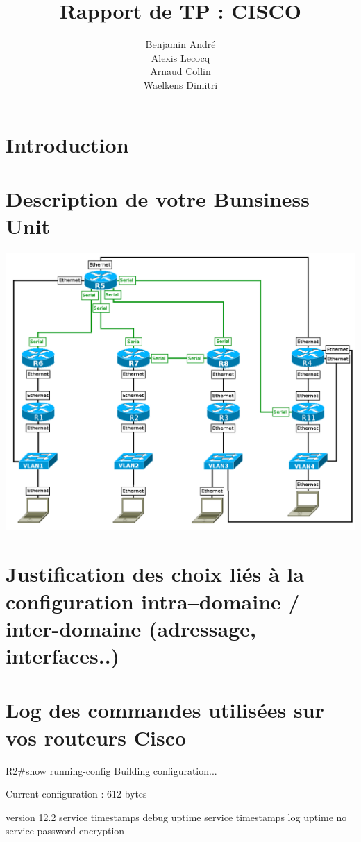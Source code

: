 \documentclass{article}
\author{Benjamin André\\Alexis Lecocq\\Arnaud Collin\\Waelkens Dimitri}
\title{Rapport de TP : CISCO}
\begin{document}
\maketitle

\section{Introduction}%

\section{Description de votre Bunsiness Unit}

\includegraphics[scale=0.2]{image.png}

\section{Justification des choix liés à la configuration intra--domaine / inter-domaine (adressage, interfaces..)}

\section{Log des commandes utilisées sur vos routeurs Cisco}

R2\#show running-config
Building configuration...

Current configuration : 612 bytes

version 12.2
service timestamps debug uptime
service timestamps log uptime
no service password-encryption
\end{document}

